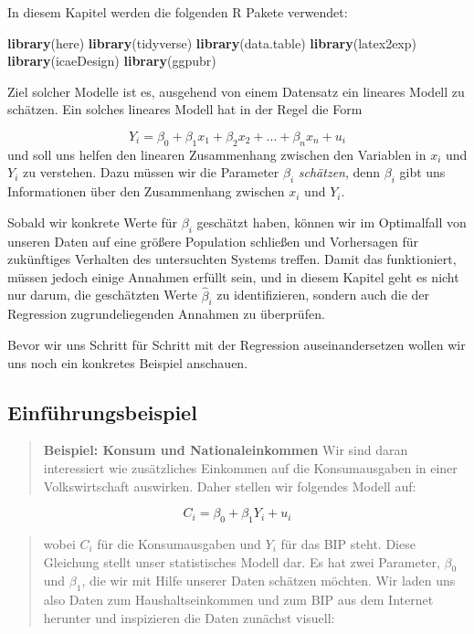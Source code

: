 \documentclass[]{book}
\newenvironment{Shaded}{\begin{snugshade}}{\end{snugshade}}
\newcommand{\KeywordTok}[1]{\textcolor[rgb]{0.13,0.29,0.53}{\textbf{#1}}}
\newcommand{\NormalTok}[1]{#1}
\begin{document}
In diesem Kapitel werden die folgenden R Pakete verwendet:

\begin{Shaded}
\begin{Highlighting}[]
\KeywordTok{library}\NormalTok{(here)}
\KeywordTok{library}\NormalTok{(tidyverse)}
\KeywordTok{library}\NormalTok{(data.table)}
\KeywordTok{library}\NormalTok{(latex2exp)}
\KeywordTok{library}\NormalTok{(icaeDesign)}
\KeywordTok{library}\NormalTok{(ggpubr)}
\end{Highlighting}
\end{Shaded}

Ziel solcher Modelle ist es, ausgehend von einem Datensatz ein lineares
Modell zu schätzen. Ein solches lineares Modell hat in der Regel die
Form

\[Y_i = \beta_0 + \beta_1 x_1 + \beta_2 x_2 + ... + \beta_n x_n + u_i\]
und soll uns helfen den linearen Zusammenhang zwischen den Variablen in
\(x_i\) und \(Y_i\) zu verstehen. Dazu müssen wir die Parameter
\(\beta_i\) \emph{schätzen}, denn \(\beta_i\) gibt uns Informationen
über den Zusammenhang zwischen \(x_i\) und \(Y_i\).

Sobald wir konkrete Werte für \(\beta_i\) geschätzt haben, können wir im
Optimalfall von unseren Daten auf eine größere Population schließen und
Vorhersagen für zukünftiges Verhalten des untersuchten Systems treffen.
Damit das funktioniert, müssen jedoch einige Annahmen erfüllt sein, und
in diesem Kapitel geht es nicht nur darum, die geschätzten Werte
\(\hat{\beta}_i\) zu identifizieren, sondern auch die der Regression
zugrundeliegenden Annahmen zu überprüfen.

Bevor wir uns Schritt für Schritt mit der Regression auseinandersetzen
wollen wir uns noch ein konkretes Beispiel anschauen.

\subsection{Einführungsbeispiel}\label{einfuhrungsbeispiel}

\begin{quote}
\textbf{Beispiel: Konsum und Nationaleinkommen} Wir sind daran
interessiert wie zusätzliches Einkommen auf die Konsumausgaben in einer
Volkswirtschaft auswirken. Daher stellen wir folgendes Modell auf:
\end{quote}

\[C_i = \beta_0 + \beta_1 Y_i + u_i\]

\begin{quote}
wobei \(C_i\) für die Konsumausgaben und \(Y_i\) für das BIP steht.
Diese Gleichung stellt unser statistisches Modell dar. Es hat zwei
Parameter, \(\beta_0\) und \(\beta_1\), die wir mit Hilfe unserer Daten
schätzen möchten. Wir laden uns also Daten zum Haushaltseinkommen und
zum BIP aus dem Internet herunter und inspizieren die Daten zunächst
visuell:
\end{quote}
\end{document}
